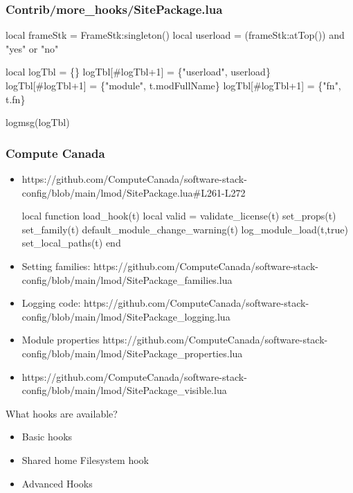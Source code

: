 \documentclass{beamer}
\begin{document}
\begin{frame}[fragile]
  \frametitle{Contrib/more\_hooks/SitePackage.lua}
    {\small
\begin{semiverbatim}
  local frameStk = FrameStk:singleton()
  local userload = (frameStk:atTop()) and
                   "yes" or "no"

  local logTbl       = \{\}
  logTbl[\#logTbl+1]  = \{"userload", userload\}
  logTbl[\#logTbl+1]  = \{"module", t.modFullName\}
  logTbl[\#logTbl+1]  = \{"fn", t.fn\}

  logmsg(logTbl)
\end{semiverbatim}
    }
\end{frame}

\begin{frame}[fragile]
  \frametitle{Compute Canada}
  \begin{itemize}
    \item https://github.com/ComputeCanada/software-stack-config/blob/main/lmod/SitePackage.lua\#L261-L272
    {\tiny
\begin{semiverbatim}
     local function load\_hook(t)
        local valid = validate\_license(t)
        set\_props(t)
        set\_family(t)
        default\_module\_change\_warning(t)
        log\_module\_load(t,true)
        set\_local\_paths(t)
     end
\end{semiverbatim}
    }
    \item Setting families: https://github.com/ComputeCanada/software-stack-config/blob/main/lmod/SitePackage\_families.lua
    \item Logging code:
      https://github.com/ComputeCanada/software-stack-config/blob/main/lmod/SitePackage\_logging.lua
    \item  Module properties https://github.com/ComputeCanada/software-stack-config/blob/main/lmod/SitePackage\_properties.lua
    \item https://github.com/ComputeCanada/software-stack-config/blob/main/lmod/SitePackage\_visible.lua
    \end{itemize}
\end{frame}

\begin{frame}{What hooks are available?}
  \begin{itemize}
    \item Basic hooks
    \item Shared home Filesystem hook
    \item Advanced Hooks
  \end{itemize}
\end{frame}
\end{document}
